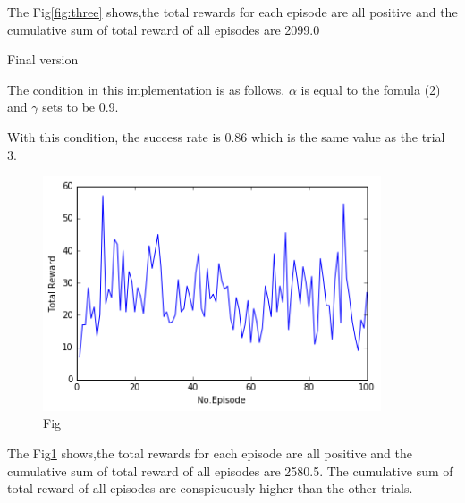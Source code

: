 \documentclass[a4paper,11pt]{article}
\begin{document}
The Fig\ref{fig:three} shows,the total rewards for each episode are all positive and the cumulative sum of total reward of all episodes are 2099.0


Final version

The condition in this implementation is as follows.
$\alpha$ is equal to the fomula (2) and $\gamma$ sets to be 0.9.

With this condition, the success rate is 0.86 which is the same value as the trial 3.

\begin{figure}[H]
\begin{center}
\includegraphics[width=100mm]{graph/gamma_con.jpg}
\end{center}
\caption{Fig}
\label{fig:four}
\end{figure}

The Fig\ref{fig:four} shows,the total rewards for each episode are all positive and the cumulative sum of total reward of all episodes are 2580.5.
The cumulative sum of total reward of all episodes are conspicuously higher than the other trials. 
\end{document}
